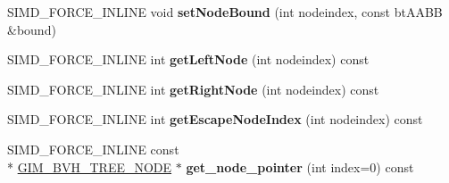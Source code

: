 \begin{DoxyCompactItemize}
\item 
\hypertarget{classbt_bvh_tree_a789e785f88d84a857ca1931ff85a4b7d}{S\+I\+M\+D\+\_\+\+F\+O\+R\+C\+E\+\_\+\+I\+N\+L\+I\+N\+E void {\bfseries set\+Node\+Bound} (int nodeindex, const bt\+A\+A\+B\+B \&bound)}\label{classbt_bvh_tree_a789e785f88d84a857ca1931ff85a4b7d}

\item 
\hypertarget{classbt_bvh_tree_a0dd0180bf26b79a558511bbbcc7ad720}{S\+I\+M\+D\+\_\+\+F\+O\+R\+C\+E\+\_\+\+I\+N\+L\+I\+N\+E int {\bfseries get\+Left\+Node} (int nodeindex) const }\label{classbt_bvh_tree_a0dd0180bf26b79a558511bbbcc7ad720}

\item 
\hypertarget{classbt_bvh_tree_a15ddcfbc96afaaca31127d0c835a022d}{S\+I\+M\+D\+\_\+\+F\+O\+R\+C\+E\+\_\+\+I\+N\+L\+I\+N\+E int {\bfseries get\+Right\+Node} (int nodeindex) const }\label{classbt_bvh_tree_a15ddcfbc96afaaca31127d0c835a022d}

\item 
\hypertarget{classbt_bvh_tree_a755fb9eb99a5269dc6ce6f408768b199}{S\+I\+M\+D\+\_\+\+F\+O\+R\+C\+E\+\_\+\+I\+N\+L\+I\+N\+E int {\bfseries get\+Escape\+Node\+Index} (int nodeindex) const }\label{classbt_bvh_tree_a755fb9eb99a5269dc6ce6f408768b199}

\item 
\hypertarget{classbt_bvh_tree_a82f96e3b273eb1efbd67fc16a23cf633}{S\+I\+M\+D\+\_\+\+F\+O\+R\+C\+E\+\_\+\+I\+N\+L\+I\+N\+E const \\*
\hyperlink{class_g_i_m___b_v_h___t_r_e_e___n_o_d_e}{G\+I\+M\+\_\+\+B\+V\+H\+\_\+\+T\+R\+E\+E\+\_\+\+N\+O\+D\+E} $\ast$ {\bfseries get\+\_\+node\+\_\+pointer} (int index=0) const }\label{classbt_bvh_tree_a82f96e3b273eb1efbd67fc16a23cf633}

\end{DoxyCompactItemize}

